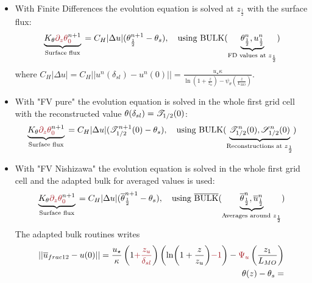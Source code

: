 \begin{itemize}
	\item With Finite Differences the evolution equation is
		solved at $z_{\frac{1}{2}}$ with the surface flux:
		\begin{equation}
			\underbrace{K_\theta
			\emphase{\partial_z \theta}^{n+1}_\emphase{0}}_{\text{
				Surface flux
			}} =
			C_H|\Delta u|(
			\theta_{\frac{1}{2}}^{n+1} - \theta_s),
			~~~ \text{using } {\rm BULK}
			(\underbrace{\theta_{\frac{1}{2}}^{n},
			u_{\frac{1}{2}}^{n}}_{
				\text{FD values at } z_{\frac{1}{2}}
			})
		\end{equation}
		where 
$C_H|\Delta u| = C_H||u^n(\delta_{sl})- u^n(0)|| = 
\frac{u_\star \kappa}{\ln\left(1+\frac{z}{z_{u}}\right)
    - \psi_\theta\left(\frac{z}{L_{MO}}\right) }$.

	\item With "FV pure" the evolution equation is solved in 
		the whole first grid cell with the reconstructed
		value $\theta(\delta_{sl}) = {\cal T}_{1/2}(0)$:
		\begin{equation}
			\underbrace{K_\theta
			\emphase{\partial_z \theta}^{n+1}_\emphase{0}}_{\text{
				Surface flux
			}} =
			C_H|\Delta u|({\cal T}_{1/2}^{n+1}(0)
			- \theta_s),
			~~~ \text{using } {\rm BULK}
			(\underbrace{{\cal T}_{1/2}^{n}(0),
			{\cal S}_{1/2}^{n}(0)}_{
			\text{Reconstructions at } z_{\frac{1}{2}}
			})
		\end{equation}
	\item With "FV Nishizawa" the evolution equation is solved in
		the whole first grid cell and the adapted bulk
		for averaged values is used:
		\begin{equation}
			\underbrace{K_\theta
			\emphase{\partial_z \theta}^{n+1}_\emphase{0}}_{\text{
				Surface flux
			}} =
			C_H|\Delta u| (
			\overline{\theta}_{\frac{1}{2}}^{n+1}
			- \theta_s),
			~~~ \text{using } \overline{\rm BULK}
			(\underbrace{\overline{\theta}_{\frac{1}{2}}^{n},
			\overline{u}_{\frac{1}{2}}^{n}}_{
			\text{Averages around } z_\frac{1}{2}})
		\end{equation}
		The adapted bulk routines writes
		\begin{equation}
		\label{eq:ND_StratifiedCase_MOST}
		\begin{aligned}
			 ||\overline{u}_{frac{1}{2}}-u(0)||
			 = \frac{u_\star}{\kappa}
			\left(1\emphase{+\frac{z_u}{\delta_{sl}}}\right)
		\left(\ln(1+\frac{z}{z_u})\emphase{-1}\right)
		- \emphase{\Psi_u}\left(\frac{z_1}{L_{MO}}\right)
		    \\
		     \theta(z) - \theta_s=

\end{aligned}
\end{equation}
\end{itemize}
